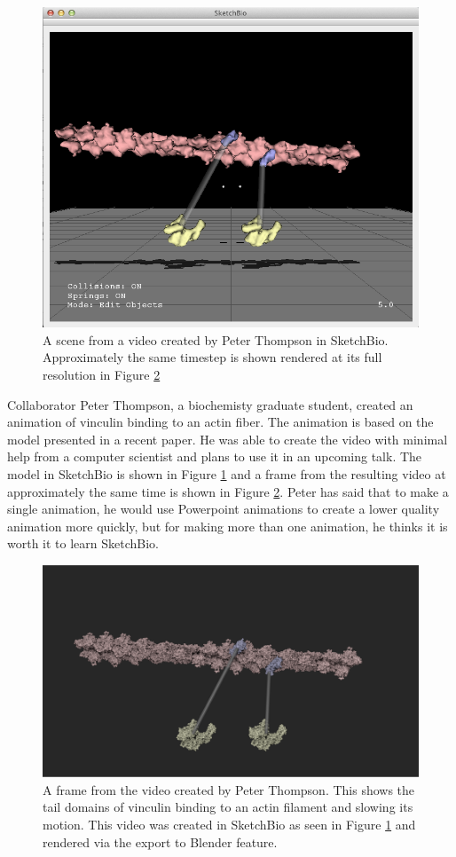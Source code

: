 \documentclass[twocolumn]{bmcart}%
\begin{document}
\begin{figure}[h]
\centering
\includegraphics[width=0.8\columnwidth]{peter_model.png}
\caption{A scene from a video created by Peter Thompson in SketchBio.  Approximately the same timestep is shown rendered at its full resolution in Figure \ref{fig:peter_video}}
\label{fig:peter_model}
\end{figure}


Collaborator Peter Thompson, a biochemisty graduate student, created an animation of vinculin binding to an actin fiber.  The animation is based on the model presented in a recent paper.  He was able to create the video with minimal help from a computer scientist and plans to use it in an upcoming talk.  The model in SketchBio is shown in Figure \ref{fig:peter_model} and a frame from the resulting video at approximately the same time is shown in Figure \ref{fig:peter_video}.  Peter has said that to make a single animation, he would use Powerpoint animations to create a lower quality animation more quickly, but for making more than one animation, he thinks it is worth it to learn SketchBio.


\begin{figure}[h!]
\centering
\includegraphics[width=0.8\columnwidth]{peter_video.png}
\caption{A frame from the video created by Peter Thompson.  This shows the tail domains of vinculin binding to an actin filament and slowing its motion.  This video was created in SketchBio as seen in Figure \ref{fig:peter_model} and rendered via the export to Blender feature.}
\label{fig:peter_video}
\end{figure}
\end{document}
